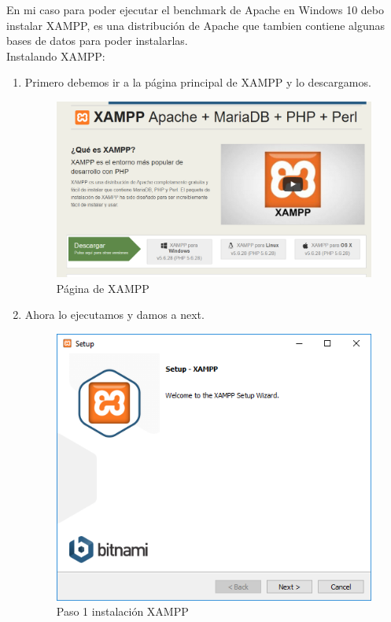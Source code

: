 En mi caso para poder ejecutar el benchmark de Apache en Windows 10 debo instalar XAMPP, es una distribución de Apache que tambien contiene algunas bases de datos para poder instalarlas.\\

Instalando XAMPP:

\begin{enumerate}
	
	\item Primero debemos ir a la página principal de XAMPP \cite{xampp} y lo descargamos.
	
	\begin{figure}[H] %
		\centering
		\includegraphics[scale=0.3]{pics/xampp1}  %
		\caption{Página de XAMPP} \label{fig:XAMPP1}
	\end{figure}
	
	\item Ahora lo ejecutamos y damos a next.
	
	\begin{figure}[H] %
		\centering
		\includegraphics[scale=0.4]{pics/xampp2}  %
		\caption{Paso 1 instalación XAMPP} \label{fig:XAMPP2}
	\end{figure}
	

\end{enumerate}
